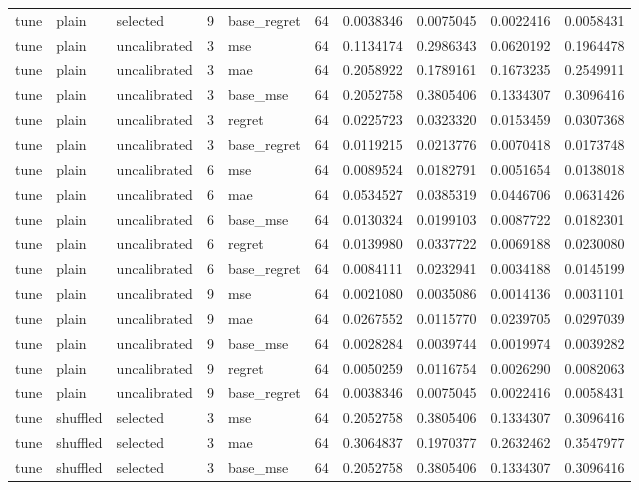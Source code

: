 \begin{tabular}{lllrlrrrrr}
tune & plain & selected & 9 & base_regret & 64 & 0.0038346 & 0.0075045 & 0.0022416 & 0.0058431 \\
tune & plain & uncalibrated & 3 & mse & 64 & 0.1134174 & 0.2986343 & 0.0620192 & 0.1964478 \\
tune & plain & uncalibrated & 3 & mae & 64 & 0.2058922 & 0.1789161 & 0.1673235 & 0.2549911 \\
tune & plain & uncalibrated & 3 & base_mse & 64 & 0.2052758 & 0.3805406 & 0.1334307 & 0.3096416 \\
tune & plain & uncalibrated & 3 & regret & 64 & 0.0225723 & 0.0323320 & 0.0153459 & 0.0307368 \\
tune & plain & uncalibrated & 3 & base_regret & 64 & 0.0119215 & 0.0213776 & 0.0070418 & 0.0173748 \\
tune & plain & uncalibrated & 6 & mse & 64 & 0.0089524 & 0.0182791 & 0.0051654 & 0.0138018 \\
tune & plain & uncalibrated & 6 & mae & 64 & 0.0534527 & 0.0385319 & 0.0446706 & 0.0631426 \\
tune & plain & uncalibrated & 6 & base_mse & 64 & 0.0130324 & 0.0199103 & 0.0087722 & 0.0182301 \\
tune & plain & uncalibrated & 6 & regret & 64 & 0.0139980 & 0.0337722 & 0.0069188 & 0.0230080 \\
tune & plain & uncalibrated & 6 & base_regret & 64 & 0.0084111 & 0.0232941 & 0.0034188 & 0.0145199 \\
tune & plain & uncalibrated & 9 & mse & 64 & 0.0021080 & 0.0035086 & 0.0014136 & 0.0031101 \\
tune & plain & uncalibrated & 9 & mae & 64 & 0.0267552 & 0.0115770 & 0.0239705 & 0.0297039 \\
tune & plain & uncalibrated & 9 & base_mse & 64 & 0.0028284 & 0.0039744 & 0.0019974 & 0.0039282 \\
tune & plain & uncalibrated & 9 & regret & 64 & 0.0050259 & 0.0116754 & 0.0026290 & 0.0082063 \\
tune & plain & uncalibrated & 9 & base_regret & 64 & 0.0038346 & 0.0075045 & 0.0022416 & 0.0058431 \\
tune & shuffled & selected & 3 & mse & 64 & 0.2052758 & 0.3805406 & 0.1334307 & 0.3096416 \\
tune & shuffled & selected & 3 & mae & 64 & 0.3064837 & 0.1970377 & 0.2632462 & 0.3547977 \\
tune & shuffled & selected & 3 & base_mse & 64 & 0.2052758 & 0.3805406 & 0.1334307 & 0.3096416 \\

\end{tabular}
